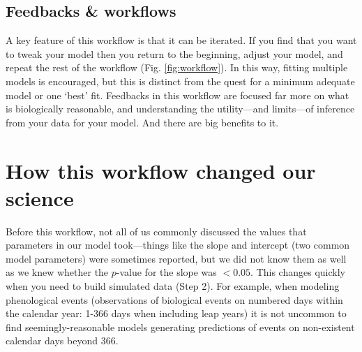 \documentclass[11pt]{article}
\newcommand{\R}[1]{\label{}\linelabel{#1}}
\begin{document}
\subsection*{Feedbacks \& workflows}
A key feature of this workflow is that it can be iterated.  If you find that you want to tweak your model then you return to the beginning, adjust your model, and repeat the rest of the workflow (Fig. \ref{fig:workflow}). In this way, fitting multiple models is encouraged, but this is distinct from the quest for a minimum adequate model or one `best' fit. Feedbacks in this workflow are focused far more on what is biologically reasonable, and understanding the utility---and limits---of inference from your data for your model.  And there are big benefits to it. 


\section*{How this workflow changed our science} 
Before this workflow, not all of us commonly discussed the values that parameters in our model took---things like the slope and intercept (two common model parameters) were sometimes reported, but we did not know them as well as we knew whether the $p$-value for the slope was $<0.05$. This changes quickly when you need to build simulated data (Step 2). For example, when modeling phenological events (observations of biological events on numbered days within the calendar year: 1-366 days when including leap years) it is not uncommon to find seemingly-reasonable models generating predictions of events on non-existent calendar days beyond 366.\R{calendarday} %
\end{document}
